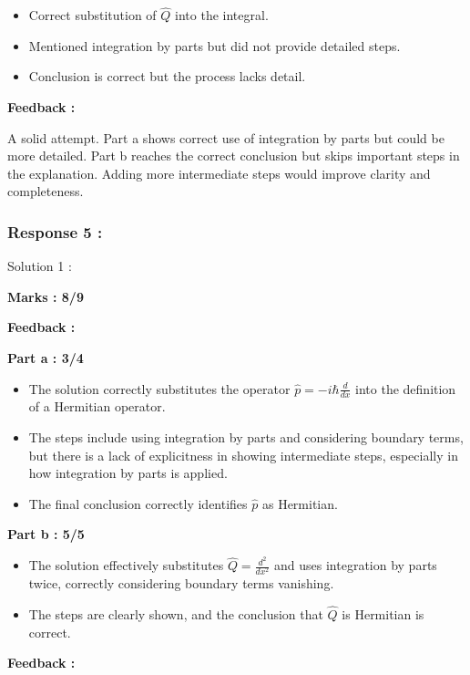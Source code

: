 \documentclass[a4paper,11pt]{article}
\begin{document}
\begin{itemize}
    \item Correct substitution of $\hat{Q}$ into the integral.
    \item Mentioned integration by parts but did not provide detailed steps.
    \item Conclusion is correct but the process lacks detail.
\end{itemize}

\textbf{Feedback :}

A solid attempt. Part a shows correct use of integration by parts but could be more detailed. Part b reaches the correct conclusion but skips important steps in the explanation. Adding more intermediate steps would improve clarity and completeness.




\subsubsection*{Response 5 :}

Solution 1 :

\textbf{Marks : 8/9}

\textbf{Feedback :}

\textbf{Part a : 3/4}

\begin{itemize}
    \item The solution correctly substitutes the operator $\hat{p} = -i\hbar \frac{d}{dx}$ into the definition of a Hermitian operator.
    \item The steps include using integration by parts and considering boundary terms, but there is a lack of explicitness in showing intermediate steps, especially in how integration by parts is applied.
    \item The final conclusion correctly identifies $\hat{p}$ as Hermitian.
\end{itemize}


\textbf{Part b : 5/5}

\begin{itemize}
    \item The solution effectively substitutes $\hat{Q} = \frac{d^2}{dx^2}$ and uses integration by parts twice, correctly considering boundary terms vanishing.
    \item The steps are clearly shown, and the conclusion that $\hat{Q}$ is Hermitian is correct.
\end{itemize}

\textbf{Feedback :}
\end{document}
